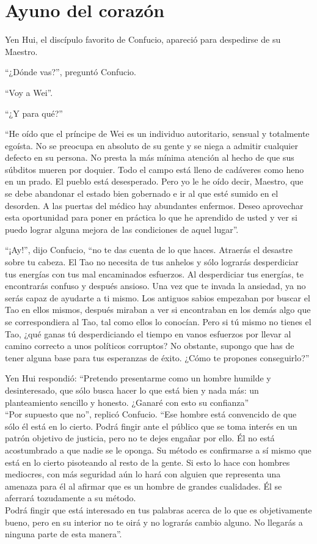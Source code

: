 \documentclass[hidelinks]{memoir}
\begin{document}
	\chapter*{Ayuno del corazón}
	
	Yen Hui, el discípulo favorito de Confucio, apareció para despedirse de
	su Maestro.
	
	``¿Dónde vas?'', preguntó Confucio.
	
	``Voy a Wei''.
	
	``¿Y para qué?''
	
	``He oído que el príncipe de Wei es un individuo autoritario, sensual y
	totalmente egoísta. No se preocupa en absoluto de su gente y se niega a
	admitir cualquier defecto en su persona. No presta la más mínima
	atención al hecho de que sus súbditos mueren por doquier. Todo el campo
	está lleno de cadáveres como heno en un prado. El pueblo está
	desesperado. Pero yo le he oído decir, Maestro, que se debe abandonar el
	estado bien gobernado e ir al que esté sumido en el desorden. A las
	puertas del médico hay abundantes enfermos. Deseo aprovechar esta
	oportunidad para poner en práctica lo que he aprendido de usted y ver si
	puedo lograr alguna mejora de las condiciones de aquel lugar''.
	
	``¡Ay!'', dijo Confucio, ``no te das cuenta de lo que haces. Atraerás el
	desastre sobre tu cabeza. El Tao no necesita de tus anhelos y sólo
	lograrás desperdiciar tus energías con tus mal encaminados esfuerzos. Al
	desperdiciar tus energías, te encontrarás confuso y después ansioso. Una
	vez que te invada la ansiedad, ya no serás capaz de ayudarte a ti mismo.
	Los antiguos sabios empezaban por buscar el Tao en ellos mismos, después
	miraban a ver si encontraban en los demás algo que se correspondiera al
	Tao, tal como ellos lo conocían. Pero si tú mismo no tienes el Tao, ¿qué
	ganas tú desperdiciando el tiempo en vanos esfuerzos por llevar al
	camino correcto a unos políticos corruptos? No obstante, supongo que has
	de tener alguna base para tus esperanzas de éxito. ¿Cómo te propones
	conseguirlo?''
	
	Yen Hui respondió: ``Pretendo presentarme como un hombre humilde y
	desinteresado, que sólo busca hacer lo que está bien y nada más: un
	planteamiento sencillo y honesto. ¿Ganaré con esto su confianza''\\
	``Por supuesto que no'', replicó Confucio. ``Ese hombre está convencido
	de que sólo él está en lo cierto. Podrá fingir ante el público que se
	toma interés en un patrón objetivo de justicia, pero no te dejes engañar
	por ello. Él no está acostumbrado a que nadie se le oponga. Su método es
	confirmarse a sí mismo que está en lo cierto pisoteando al resto de la
	gente. Si esto lo hace con hombres mediocres, con más seguridad aún lo
	hará con alguien que representa una amenaza para él al afirmar que es un
	hombre de grandes cualidades. Él se aferrará tozudamente a su método.\\
	Podrá fingir que está interesado en tus palabras acerca de lo que es
	objetivamente bueno, pero en su interior no te oirá y no lograrás cambio
	alguno. No llegarás a ninguna parte de esta manera''.
	
\end{document}
